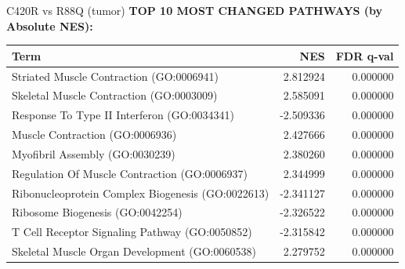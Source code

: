 \documentclass[10pt, aspectratio=169]{beamer}
\begin{document}
\begin{frame}{C420R vs R88Q (tumor)}
  \centering
  {\small \textbf{TOP 10 MOST CHANGED PATHWAYS (by Absolute NES):}}\par
  \vspace{0.15cm}
  \scriptsize
  \begin{tabular}{p{8cm} r r}
    \toprule
    \textbf{Term} & \textbf{NES} & \textbf{FDR q-val} \\
    \midrule
    Striated Muscle Contraction (GO:0006941) & 2.812924 & 0.000000 \\
    Skeletal Muscle Contraction (GO:0003009) & 2.585091 & 0.000000 \\
    Response To Type II Interferon (GO:0034341) & -2.509336 & 0.000000 \\
    Muscle Contraction (GO:0006936) & 2.427666 & 0.000000 \\
    Myofibril Assembly (GO:0030239) & 2.380260 & 0.000000 \\
    Regulation Of Muscle Contraction (GO:0006937) & 2.344999 & 0.000000 \\
    Ribonucleoprotein Complex Biogenesis (GO:0022613) & -2.341127 & 0.000000 \\
    Ribosome Biogenesis (GO:0042254) & -2.326522 & 0.000000 \\
    T Cell Receptor Signaling Pathway (GO:0050852) & -2.315842 & 0.000000 \\
    Skeletal Muscle Organ Development (GO:0060538) & 2.279752 & 0.000000 \\
    \bottomrule
  \end{tabular}
\end{frame}
\end{document}
